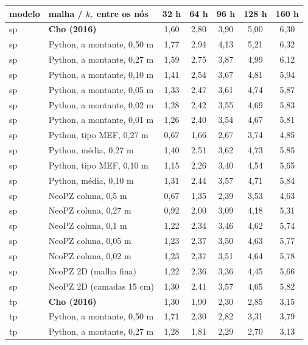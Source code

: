 \begin{tabular}{ll|ccccc}
\toprule
modelo & malha / $k_r$ entre os nós & 32 h & 64 h & 96 h & 128 h & 160 h\\
\midrule
sp & \textbf{Cho (2016)} & 1{,}60 & 2{,}80 & 3{,}90 & 5{,}00 & 6{,}30\\
sp & Python, a montante, 0{,}50 m & 1{,}77 & 2{,}94 & 4{,}13 & 5{,}21 & 6{,}32\\
sp & Python, a montante, 0{,}27 m & 1{,}59 & 2{,}75 & 3{,}87 & 4{,}99 & 6{,}12\\
sp & Python, a montante, 0{,}10 m & 1{,}41 & 2{,}54 & 3{,}67 & 4{,}81 & 5{,}94\\
sp & Python, a montante, 0{,}05 m & 1{,}33 & 2{,}47 & 3{,}61 & 4{,}74 & 5{,}87\\
sp & Python, a montante, 0{,}02 m & 1{,}28 & 2{,}42 & 3{,}55 & 4{,}69 & 5{,}83\\
sp & Python, a montante, 0{,}01 m & 1{,}26 & 2{,}40 & 3{,}54 & 4{,}67 & 5{,}81\\
sp & Python, tipo MEF, 0{,}27 m & 0{,}67 & 1{,}66 & 2{,}67 & 3{,}74 & 4{,}85\\
sp & Python, média, 0{,}27 m & 1{,}40 & 2{,}51 & 3{,}62 & 4{,}73 & 5{,}85\\
sp & Python, tipo MEF, 0{,}10 m & 1{,}15 & 2{,}26 & 3{,}40 & 4{,}54 & 5{,}65\\
sp & Python, média, 0{,}10 m & 1{,}31 & 2{,}44 & 3{,}57 & 4{,}71 & 5{,}84\\
sp & NeoPZ coluna, 0,5 m & 0{,}67 & 1{,}35 & 2{,}39 & 3{,}53 & 4{,}63\\
sp & NeoPZ coluna, 0,27 m & 0{,}92 & 2{,}00 & 3{,}09 & 4{,}18 & 5{,}31\\
sp & NeoPZ coluna, 0,1 m & 1{,}22 & 2{,}34 & 3{,}46 & 4{,}62 & 5{,}74\\
sp & NeoPZ coluna, 0,05 m & 1{,}23 & 2{,}37 & 3{,}50 & 4{,}63 & 5{,}77\\
sp & NeoPZ coluna, 0,02 m & 1{,}23 & 2{,}37 & 3{,}51 & 4{,}64 & 5{,}78\\
sp & NeoPZ 2D (malha fina) & 1{,}22 & 2{,}36 & 3{,}36 & 4{,}45 & 5{,}66\\
sp & NeoPZ 2D (camadas 15 cm) & 1{,}30 & 2{,}41 & 3{,}57 & 4{,}65 & 5{,}82\\
\midrule
tp & \textbf{Cho (2016)} & 1{,}30 & 1{,}90 & 2{,}30 & 2{,}85 & 3{,}15\\
tp & Python, a montante, 0{,}50 m & 1{,}71 & 2{,}30 & 2{,}82 & 3{,}31 & 3{,}79\\
tp & Python, a montante, 0{,}27 m & 1{,}28 & 1{,}81 & 2{,}29 & 2{,}70 & 3{,}13\\

\end{tabular}
